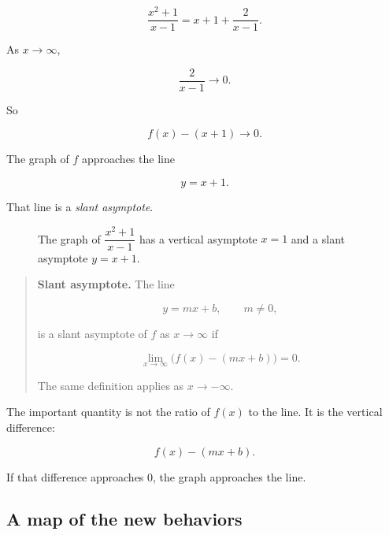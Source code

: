 \[
\frac{x^2+1}{x-1}
=
x+1+\frac{2}{x-1}.
\]

As \(x\to\infty\),

\[
\frac{2}{x-1}\to0.
\]

So

\[
f(x)-(x+1)\to0.
\]

The graph of \(f\) approaches the line

\[
y=x+1.
\]

That line is a \emph{slant asymptote}.

\begin{figure}[h]
\centering
{}
\caption{The graph of \(\dfrac{x^2+1}{x-1}\) has a vertical asymptote \(x=1\) and a slant asymptote \(y=x+1\).}
\label{fig:slant-asymptote}
\end{figure}

\begin{quote}
\textbf{Slant asymptote.}
The line

\[
y=mx+b,
\qquad m\neq0,
\]

is a slant asymptote of \(f\) as \(x\to\infty\) if

\[
\lim_{x\to\infty}\bigl(f(x)-(mx+b)\bigr)=0.
\]

The same definition applies as \(x\to-\infty\).
\end{quote}

The important quantity is not the ratio of \(f(x)\) to the line.  It is the vertical difference:

\[
f(x)-(mx+b).
\]

If that difference approaches \(0\), the graph approaches the line.

\subsection{A map of the new behaviors}
\label{subsec:map-new-limit-behaviors}

